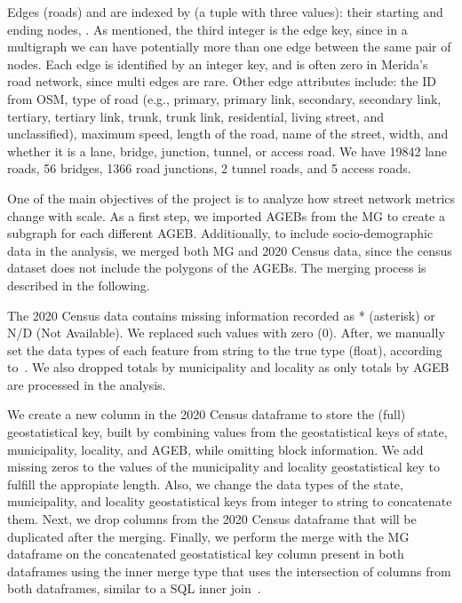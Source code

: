 Edges (roads) and are indexed by \added(a tuple with three values): their starting and ending nodes, .  As mentioned, the third integer is the edge key, since in a multigraph we can have potentially more than one edge between the same pair of nodes. Each edge is identified by an integer key, and is often zero in Merida's road network, since multi edges are rare. Other edge attributes include: the ID from OSM, type of road (e.g., primary, primary link, secondary, secondary link, tertiary, tertiary link, trunk, trunk link, residential, living street, and unclassified), maximum speed, length of the road, name of the street, width, and whether it is a lane, bridge, junction, tunnel, or access road. We have 19842 lane roads, 56 bridges, 1366 road junctions, 2 tunnel roads, and 5 access roads.

One of the main objectives of the project is to analyze how street network metrics change with scale. As a first step, we imported AGEBs from the MG to create a subgraph for each different AGEB. Additionally, to include socio-demographic data in the analysis, we merged both MG and 2020 Census data, since the census dataset does not include the polygons of the AGEBs. The merging process is described in the following.

The 2020 Census data contains missing information recorded as * (asterisk) or N/D (Not Available). We replaced such values with zero (0). After,  we manually set the data types of each feature from string to the true type (float), according to~\cite{census_data}. We also dropped totals by municipality and locality as only totals by AGEB are processed in the analysis.

We create a new column in the 2020 Census dataframe to store the (full) geostatistical key, built by combining values from the geostatistical keys of state, municipality, locality, and AGEB, while omitting block information.
 We add missing zeros to the values of the municipality and locality geostatistical key to fulfill the appropiate length. Also, we change the data types of the state, municipality, and locality geostatistical keys from integer to string to concatenate them. Next, we drop columns from the 2020 Census dataframe that will be duplicated after the merging. Finally, we perform the merge with the MG dataframe on the concatenated geostatistical key column present in both dataframes using the inner merge type that uses the intersection of columns from both dataframes, similar to a SQL inner join~\cite{pandas_merge}.


